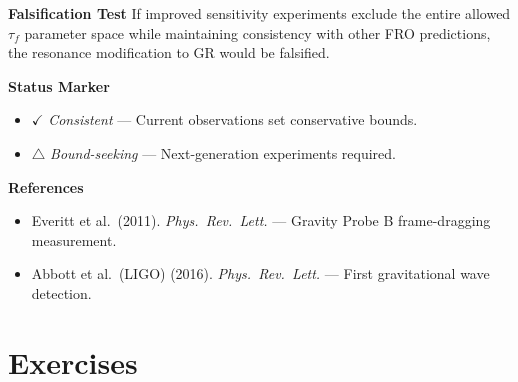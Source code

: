 \textbf{Falsification Test}
If improved sensitivity experiments exclude the entire allowed $\tau_f$ parameter space while maintaining consistency with other FRO predictions, the resonance modification to GR would be falsified.

\textbf{Status Marker}
\begin{itemize}
\item $\checkmark$ \textit{Consistent} — Current observations set conservative bounds.
\item $\triangle$ \textit{Bound-seeking} — Next-generation experiments required.
\end{itemize}

\textbf{References}
\begin{itemize}
\item Everitt et al.\ (2011). \textit{Phys.\ Rev.\ Lett.} — Gravity Probe B frame-dragging measurement\cite{everitt2011}.
\item Abbott et al.\ (LIGO) (2016). \textit{Phys.\ Rev.\ Lett.} — First gravitational wave detection\cite{abbott2016gw}.
\end{itemize}

\section*{Exercises}

